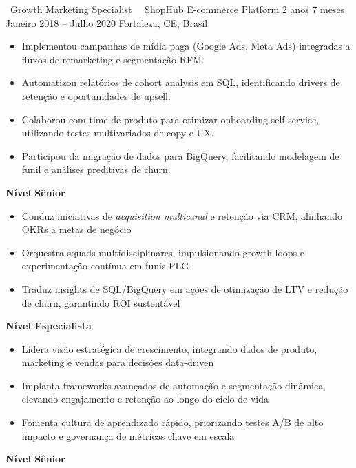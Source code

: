 \cvevent
{\faSeedling\ Growth Marketing Specialist\ \hfill \faAddressCard}
{\faBuilding\ ShopHub E-commerce Platform \hfill 2 anos 7 meses}
{Janeiro 2018 -- Julho 2020}
{Fortaleza, CE, Brasil}

\begin{itemize}[leftmargin=*,itemsep=0.5em,topsep=0.5em]
\item Implementou campanhas de mídia paga (Google Ads, Meta Ads) integradas a fluxos de remarketing e segmentação RFM.
\item Automatizou relatórios de cohort analysis em SQL, identificando drivers de retenção e oportunidades de upsell.
\item Colaborou com time de produto para otimizar onboarding self-service, utilizando testes multivariados de copy e UX.
\item Participou da migração de dados para BigQuery, facilitando modelagem de funil e análises preditivas de churn.
\end{itemize}

\textbf{Nível Sênior}
\begin{itemize}
\item Conduz iniciativas de \textit{acquisition multicanal} e retenção via CRM, alinhando OKRs a metas de negócio
\item Orquestra squads multidisciplinares, impulsionando growth loops e experimentação contínua em funis PLG
\item Traduz insights de SQL/BigQuery em ações de otimização de LTV e redução de churn, garantindo ROI sustentável
\end{itemize}

\textbf{Nível Especialista}
\begin{itemize}
\item Lidera visão estratégica de crescimento, integrando dados de produto, marketing e vendas para decisões data-driven
\item Implanta frameworks avançados de automação e segmentação dinâmica, elevando engajamento e retenção ao longo do ciclo de vida
\item Fomenta cultura de aprendizado rápido, priorizando testes A/B de alto impacto e governança de métricas chave em escala
\end{itemize}

\textbf{Nível Sênior}

